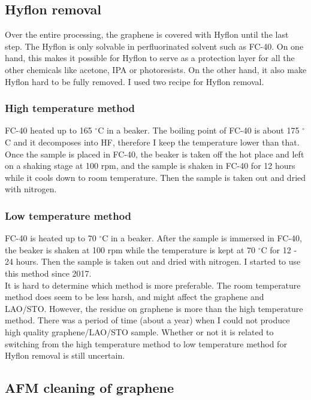 \documentclass[pdflatex, sectionletters, 12pt]{pittetd}    %
\begin{document}
\subsection{Hyflon removal}

Over the entire processing, the graphene is covered with Hyflon until the last step. The Hyflon is only solvable in perfluorinated solvent such as FC-40. On one hand, this makes it possible for Hyflon to serve as a protection layer for all the other chemicals like acetone, IPA or photoresists. On the other hand, it also make Hyflon hard to be fully removed. I used two recipe for Hyflon removal. 

\subsubsection{High temperature method} FC-40 heated up to 165 $^{\circ}$C in a beaker. The boiling point of FC-40 is about 175 $^{\circ}$C and it decomposes into HF, therefore I keep the temperature lower than that. Once the sample is placed in FC-40, the beaker is taken off the hot place and left on a shaking stage at 100 rpm, and the sample is shaken in FC-40 for 12 hours while it cools down to room temperature. Then the sample is taken out and dried with nitrogen.

\subsubsection{Low temperature method} FC-40 is heated up to 70 $^{\circ}$C in a beaker. After the sample is immersed in FC-40, the beaker is shaken at 100 rpm while the temperature is kept at 70 $^{\circ}$C for 12 - 24 hours. Then the sample is taken out and dried with nitrogen. I started to use this method since 2017.
\\

It is hard to determine which method is more preferable. The room temperature method does seem to be less harsh, and might affect the graphene and LAO/STO. However, the residue on graphene is more than the high temperature method. There was a period of time (about a year) when I could not produce high quality graphene/LAO/STO sample. Whether or not it is related to switching from the high temperature method to low temperature method for Hyflon removal is still uncertain.

\subsection{AFM cleaning of graphene}
\end{document}

